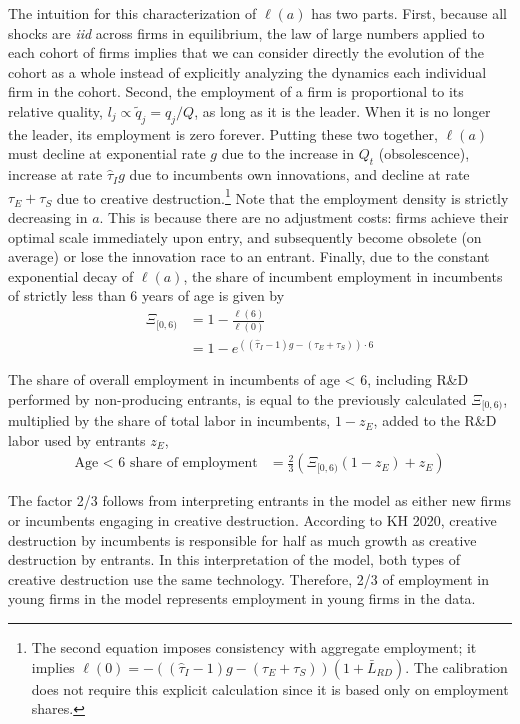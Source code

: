 \documentclass[11pt,english]{article}
\theoremstyle{remark}
\begin{document}
The intuition for this characterization of $\ell(a)$ has two parts. First, because all shocks are \textit{iid} across firms in equilibrium, the law of large numbers applied to each cohort of firms implies that we can consider directly the evolution of the cohort as a whole instead of explicitly analyzing the dynamics each individual firm in the cohort.  Second, the employment of a firm is proportional to its relative quality, $l_j \propto \tilde{q}_j = q_j / Q$, as long as it is the leader. When it is no longer the leader, its employment is zero forever. Putting these two together, $\ell(a)$ must decline at exponential rate $g$ due to the increase in $Q_t$ (obsolescence), increase at rate $\hat{\tau}_I g$ due to incumbents own innovations, and decline at rate $\tau_E + \tau_S$ due to creative destruction.\footnote{The second equation imposes consistency with aggregate employment; it implies $\ell(0) = -((\hat{\tau}_I -1)g - (\tau_E + \tau_S))(1 + \bar{L}_{RD})$. The calibration does not require this explicit calculation since it is based only on employment shares.} Note that the employment density is strictly decreasing in $a$. This is because there are no adjustment costs: firms achieve their optimal scale immediately upon entry, and subsequently become obsolete (on average) or lose the innovation race to an entrant. Finally, due to the constant exponential decay of $\ell(a)$, the share of incumbent employment in incumbents of strictly less than 6 years of age is given by 
\begin{align*}
\Xi_{[0,6)} &=  1 - \frac{\ell(6)}{\ell(0)} \\
&= 1 - e^{((\hat{\tau}_I -1)g - (\tau_E + \tau_S))\cdot 6}
\end{align*}  


The share of overall employment in incumbents of age < 6, including R\&D performed by non-producing entrants, is equal to the previously calculated $\Xi_{[0,6)}$, multiplied by the share of total labor in incumbents, $1 - z_E$, added to the R\&D labor used by entrants $z_E$, 
\begin{align*}
\textrm{Age < 6 share of employment} &= \frac{2}{3}(\Xi_{[0,6)} (1-z_E) + z_E)
\end{align*}

The factor 2/3 follows from interpreting entrants in the model as either new firms or incumbents engaging in creative destruction. According to KH 2020, creative destruction by incumbents is responsible for half as much growth as creative destruction by entrants. In this interpretation of the model, both types of creative destruction use the same technology. Therefore, 2/3 of employment in young firms in the model represents employment in young firms in the data. 
\end{document}
